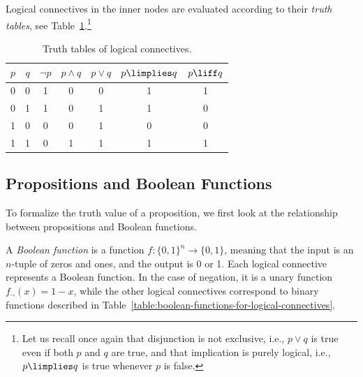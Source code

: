 Logical connectives in the inner nodes are evaluated according to their \emph{truth tables}, see Table~\ref{table:logical-connectives}.\footnote{Let us recall once again that disjunction is not exclusive, i.e., $p \lor q$ is true even if both $p$ and $q$ are true, and that implication is purely logical, i.e., $p \limplies q$ is true whenever $p$ is false.}

\begin{table}[htbp]
    \centering
    \begin{tabular}{@{}cc|ccccc@{}}
        \toprule
        $p$ & $q$ & $\neg p$ & $p \land q$ & $p \lor q$ & $p \limplies q$ & $p \liff q$ \\ \midrule
        0   & 0   & 1        & 0          & 0         & 1          & 1          \\
        0   & 1   & 1        & 0          & 1         & 1          & 0          \\
        1   & 0   & 0        & 0          & 1         & 0          & 0          \\
        1   & 1   & 0        & 1          & 1         & 1          & 1          \\ \bottomrule
    \end{tabular}
    \caption{Truth tables of logical connectives.}
    \label{table:logical-connectives}
\end{table}

\subsection{Propositions and Boolean Functions}

To formalize the truth value of a proposition, we first look at the relationship between propositions and Boolean functions. 

A \emph{Boolean function} is a function $f\colon\{0,1\}^n\to\{0,1\}$, meaning that the input is an $n$-tuple of zeros and ones, and the output is 0 or 1. Each logical connective represents a Boolean function. In the case of negation, it is a unary function $f_\neg(x)=1-x$, while the other logical connectives correspond to binary functions described in Table~\ref{table:boolean-functions-for-logical-connectives}.

